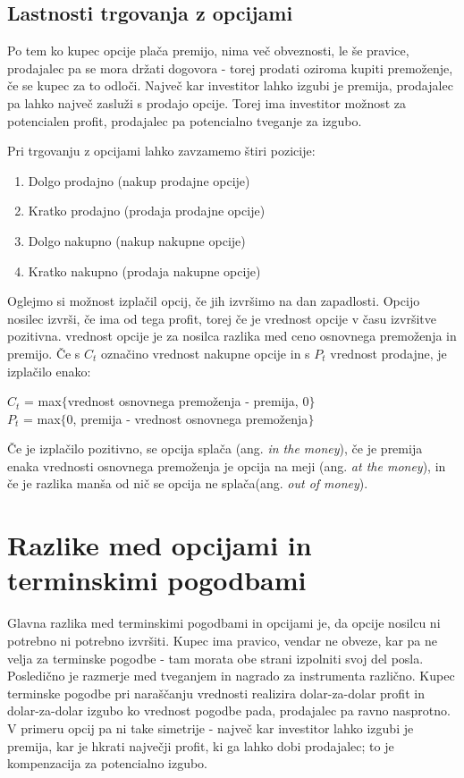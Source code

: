 \documentclass[a4paper]{article}
\begin{document}
\subsection{Lastnosti trgovanja z opcijami}
Po tem ko kupec opcije plača premijo, nima več obveznosti, le še pravice, prodajalec pa se mora držati dogovora - torej prodati
oziroma kupiti premoženje, če se kupec za to odloči. Največ kar investitor lahko izgubi je premija,
prodajalec pa lahko največ zasluži s prodajo opcije. Torej ima investitor možnost za potencialen profit,
prodajalec pa potencialno tveganje za izgubo. \par
Pri trgovanju z opcijami lahko zavzamemo štiri pozicije:
\begin{enumerate}
    \item Dolgo prodajno (nakup prodajne opcije)
    \item Kratko prodajno (prodaja prodajne opcije)
    \item Dolgo nakupno (nakup nakupne opcije)
    \item Kratko nakupno (prodaja nakupne opcije)
\end{enumerate}
\pagebreak
Oglejmo si možnost izplačil opcij, če jih izvršimo na dan zapadlosti. Opcijo nosilec izvrši, če ima od tega profit, torej
če je vrednost opcije v času izvršitve pozitivna. vrednost opcije je za nosilca razlika med ceno osnovnega premoženja in premijo.
Če s $C_{t}$ označino vrednost nakupne opcije in s $P_{t}$ vrednost prodajne, je izplačilo enako:
\begin{center}
$C_{t}$ = max$\{$vrednost osnovnega premoženja - premija, 0$\}$ \\
$P_{t}$ = max$\{$0, premija - vrednost osnovnega premoženja$\}$
\end{center}
Če je izplačilo pozitivno, se opcija splača (ang. \textit{in the money}), če je premija enaka vrednosti osnovnega premoženja
je opcija na meji (ang. \textit{at the money}), in če je razlika manša od nič se opcija ne splača(ang. \textit{out of money}).

\section{Razlike med opcijami in terminskimi pogodbami}
Glavna razlika med terminskimi pogodbami in opcijami je, da opcije nosilcu ni potrebno ni potrebno izvršiti. Kupec ima pravico,
vendar ne obveze, kar pa ne velja za terminske pogodbe - tam morata obe strani izpolniti svoj del posla.
Posledično je razmerje med tveganjem in nagrado za instrumenta različno. Kupec terminske pogodbe pri naraščanju vrednosti
realizira dolar-za-dolar profit in dolar-za-dolar izgubo ko vrednost pogodbe pada, prodajalec pa ravno nasprotno. V primeru
opcij pa ni take simetrije - največ kar investitor lahko izgubi je premija, kar je hkrati največji profit, ki ga lahko dobi prodajalec;
to je kompenzacija za potencialno izgubo.
\end{document}
